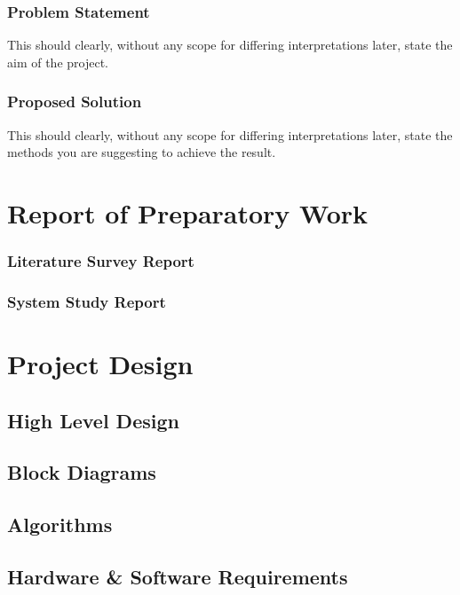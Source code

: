 \documentclass[11pt]{report}
\begin{document}
\subsection{\label{ps}Problem Statement}
This should clearly, without any scope for differing interpretations later, state the aim of the project.
\subsection{Proposed Solution}
This should clearly, without any scope for differing interpretations later, state the methods you are suggesting to achieve the result.
\chapter{\label{work}Report of Preparatory Work }
\subsection{Literature Survey Report}
\subsection{System Study Report}



\chapter{Project Design}
 \label{xx}

\section{High Level Design}
\section{Block Diagrams}


\section{Algorithms}

\section{Hardware \& Software Requirements}
\end{document}
